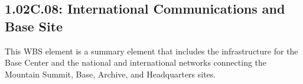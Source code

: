 \subsection{1.02C.08: International Communications and Base Site}

This WBS element is a summary element that includes the infrastructure for the
Base Center and the national and international networks connecting the
Mountain Summit, Base, Archive, and Headquarters sites.
